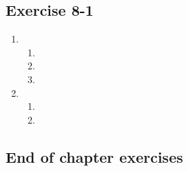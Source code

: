 \begin{enumerate}[label=\textbf{\arabic*}., itemsep=5pt]
\subsection{Exercise 8-1} %
\begin{enumerate}[label=\textbf{\arabic*}.]
\item %
 \begin{enumerate}[noitemsep, label=\textbf{(\alph*)} ] 
\item %
\item %
\item %
\end{enumerate}

\item %
 \begin{enumerate}[noitemsep, label=\textbf{(\alph*)} ] 
\item %
\item %
\end{enumerate}
\end{enumerate}


\subsection{End of chapter exercises} %


\end{enumerate}
